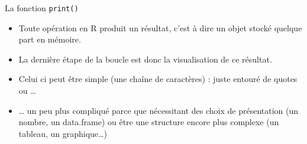 \documentclass[
  ignorenonframetext,
]{beamer}
\providecommand{\tightlist}{%
  \setlength{\itemsep}{0pt}\setlength{\parskip}{0pt}}
\begin{document}
\begin{frame}{La fonction \texttt{print()}}
\protect\hypertarget{la-fonction-print}{}
\begin{itemize}
\tightlist
\item
  Toute opération en R produit un résultat, c'est à dire un objet stocké
  quelque part en mémoire.
\item
  La dernière étape de la boucle est donc la visualisation de ce
  résultat.
\item
  Celui ci peut être simple (une chaîne de caractères) : juste entouré
  de quotes ou \ldots{}
\item
  \ldots{} un peu plus compliqué parce que nécessitant des choix de
  présentation (un nombre, un data.frame) ou être une structure encore
  plus complexe (un tableau, un graphique\ldots)
\end{itemize}
\end{frame}
\end{document}
